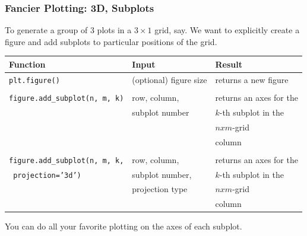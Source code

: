 \documentclass[12pt,t]{beamer}
\begin{document}
\begin{frame}
  \frametitle{Fancier Plotting: 3D, Subplots}
   \vskip-0.4cm
 To generate a group of 3 plots in a $3\times 1$ grid, say. We want to explicitly create a figure and add subplots to particular positions of the grid.
 \vskip0.3cm
 {\scriptsize{
 \begin{tabular}{lll}
 \normalsize{\textbf{Function}} &\normalsize{ \textbf{Input}} & \normalsize{\textbf{Result}}\\
 \hline
\texttt{plt.figure()} & (optional) figure size & returns a new figure\\
&&\\
\texttt{figure.add\_subplot(n, m, k)} & row, column, & returns an axes for the \\
& subplot number & $k$-th subplot in the \\
&&$nxm$-grid \\
&& column \\
&&\\
\texttt{figure.add\_subplot(n, m, k,} & row, column,  & returns an axes for the  \\
\hskip0.5cm\texttt{ projection='3d')}&subplot number,&$k$-th subplot in the \\
&projection type&$nxm$-grid \\
&& column 
  \end{tabular}}
  \vskip0.1cm
\normalsize You can do all your favorite plotting on the axes of each subplot.  
  }
  
\end{frame}
\end{document}
